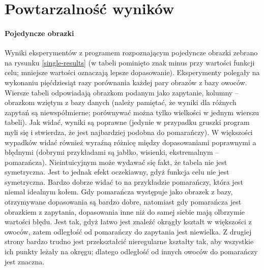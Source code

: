 \documentclass[a4paper,12pt,leqno]{article}
\begin{document}
\section{Powtarzalność wyników}

\paragraph{Pojedyncze obrazki} Wyniki eksperymentów z programem rozpoznającym pojedyncze obrazki zebrano na rysunku \ref{single-results} (w tabeli pominięto znak minus przy
wartości funkcji celu; mniejsze wartości oznaczają lepsze dopasowanie). Eksperymenty polegały na wykonaniu pięćdziesiąt razy porównania każdej pary obrazów z bazy owoców.
Wiersze tabeli odpowiadają obrazkom podanym jako zapytanie, kolumny -- obrazkom wziętym z bazy danych (należy pamiętać, że wyniki dla różnych zapytań są niewspółmierne; porównywać
można tylko wielkości w jednym wierszu tabeli). Jak widać, wyniki są poprawne (jedynie w przypadku gruszki program myli się i stwierdza, że jest najbardziej podobna do pomarańczy).
W większości wypadków widać również wyraźną różnicę między dopasowaniami poprawnymi a błędnymi (dobrymi przykładami są jabłko, wisienki, ekstremalnym -- pomarańcza). Nieintuicyjnym
może wydawać się fakt, że tabela nie jest symetryczna. Jest to jednak efekt oczekiawny, gdyż funkcja celu nie jest symetryczna. Bardzo dobrze widać to na przykładzie pomarańczy,
która jest niemal idealnym kołem. Gdy pomarańcza występuje jako obrazek z bazy, otrzymywane dopasowania są bardzo dobre, natomiast gdy pomarańcza jest obrazkiem z zapytania,
dopasowania inne niż do samej siebie mają olbrzymie wartości błędu. Jest tak, gdyż łatwo jest znaleźć okrągły kształt w większości z owoców, zatem odległość od pomarańczy do
zapytania jest niewielka. Z drugiej strony bardzo trudno jest przekształcić nieregularne kształty tak, aby wszystkie ich punkty leżały na okręgu; dlatego odległość od innych
owoców do pomarańczy jest znaczna.
\end{document}
